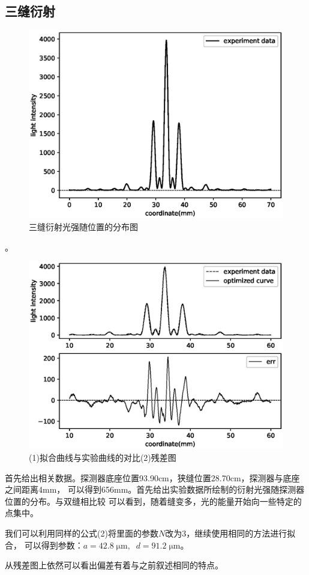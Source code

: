 \documentclass[a4paper]{ctexart}
\begin{document}
    \subsection{三缝衍射}
    \begin{figure}[htbp]
        \centering
        \includegraphics[scale=0.70]{image/triple_original.eps}
        \caption{三缝衍射光强随位置的分布图}
    \end{figure}。
    \begin{figure}[htbp]
        \centering
        \includegraphics[scale=0.70]{image/triple_fit.eps}
        \caption{(1)拟合曲线与实验曲线的对比\;\;(2)残差图}
    \end{figure}
    \par 
    首先给出相关数据。探测器底座位置93.90cm，狭缝位置28.70cm，探测器与底座之间距离4mm，
    可以得到656mm。首先给出实验数据所绘制的衍射光强随探测器位置的分布。与双缝相比较
    可以看到，随着缝变多，光的能量开始向一些特定的点集中。
    \par 
    我们可以利用同样的公式(2)将里面的参数$N$改为3，继续使用相同的方法进行拟合，
    可以得到参数：$a = 42.8\;\mathrm{\mu m},\;\;d = 91.2\;\mathrm{\mu m}$。
    \par 
    从残差图上依然可以看出偏差有着与之前叙述相同的特点。
\end{document}
